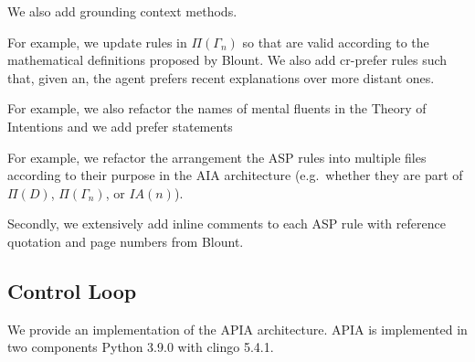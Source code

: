 We also add grounding context methods.

For example, we update rules in $\Pi(\Gamma_n)$ so that are valid according to the mathematical definitions proposed by Blount.
We also add cr-prefer rules such that, given an, the agent prefers recent explanations over more distant ones.

For example, we also refactor the names of mental fluents in the Theory of Intentions and we add prefer statements

For example, we refactor the arrangement the ASP rules into multiple files according to their purpose in the AIA architecture (e.g.~whether they are part of $\Pi(D)$, $\Pi(\Gamma_n)$, or $IA(n)$).

Secondly, we extensively add inline comments to each ASP rule with reference quotation and page numbers from Blount.

\subsection{Control Loop}

We provide an implementation of the APIA architecture.
APIA is implemented in two components Python 3.9.0 with clingo 5.4.1.
